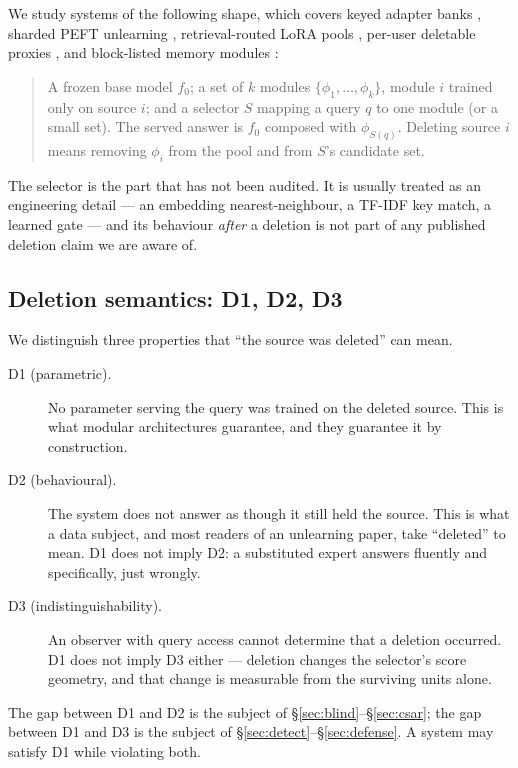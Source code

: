 \documentclass[11pt]{article}
\begin{document}
We study systems of the following shape, which covers keyed adapter banks
\citep{yu2022legonet}, sharded PEFT unlearning \citep{basuroychowdhury2025s3t}, retrieval-routed
LoRA pools \citep{zhao2024ramole}, per-user deletable proxies \citep{schneider2026sea}, and
block-listed memory modules \citep{grimes2026memadapt}:

\begin{quote}
A frozen base model $f_0$; a set of $k$ modules $\{\phi_1,\dots,\phi_k\}$, module $i$ trained only
on source $i$; and a selector $S$ mapping a query $q$ to one module (or a small set). The served
answer is $f_0$ composed with $\phi_{S(q)}$. Deleting source $i$ means removing $\phi_i$ from the
pool and from $S$'s candidate set.
\end{quote}

The selector is the part that has not been audited. It is usually treated as an engineering detail
--- an embedding nearest-neighbour, a TF-IDF key match, a learned gate --- and its behaviour
\emph{after} a deletion is not part of any published deletion claim we are aware of.

\subsection{Deletion semantics: D1, D2, D3}
\label{sec:semantics}

We distinguish three properties that ``the source was deleted'' can mean.

\begin{description}
  \item[D1 (parametric).] No parameter serving the query was trained on the deleted source. This is
    what modular architectures guarantee, and they guarantee it by construction.
  \item[D2 (behavioural).] The system does not answer as though it still held the source. This is
    what a data subject, and most readers of an unlearning paper, take ``deleted'' to mean. D1 does
    not imply D2: a substituted expert answers fluently and specifically, just wrongly.
  \item[D3 (indistinguishability).] An observer with query access cannot determine that a deletion
    occurred. D1 does not imply D3 either --- deletion changes the selector's score geometry, and
    that change is measurable from the surviving units alone.
\end{description}

The gap between D1 and D2 is the subject of \S\ref{sec:blind}--\S\ref{sec:csar}; the gap between
D1 and D3 is the subject of \S\ref{sec:detect}--\S\ref{sec:defense}. A system may satisfy D1 while
violating both.
\end{document}
